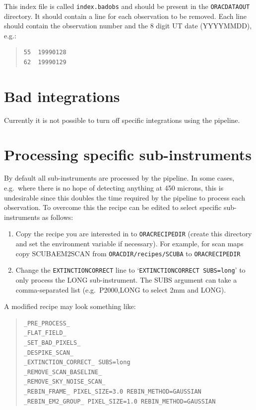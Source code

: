 \documentclass[twoside,11pt]{article}
\newcommand{\xlabel}[1]{}
\renewcommand{\_}{\texttt{\symbol{95}}}
\newcommand{\recipe}[1]{{\small\textsf{#1}}}
\newenvironment{myquote}{\begin{quote}\begin{small}}{\end{small}\end{quote}}
\begin{document}
This index file is called \texttt{index.badobs} and should be present in the
\texttt{ORAC\_DATA\_OUT} directory. It should contain a line for each observation to be
removed. Each line should contain the observation number and the 8 digit UT
date (YYYYMMDD), e.g.:

\begin{quote}
\begin{verbatim}
55  19990128
62  19990129
\end{verbatim}
\end{quote}



\section{Bad integrations\xlabel{bad_observations}}

Currently it is not possible to turn off specific integrations
using the pipeline.

\section{Processing specific sub-instruments\xlabel{processing_specific_sub_instruments}}

By default all sub-instruments are processed by the pipeline. In some
cases, e.g.\ where there is no hope of detecting anything at 450 microns, 
this is undesirable since this doubles the time required by the pipeline
to process each observation. To overcome this the recipe can be
edited to select specific sub-instruments as follows:

\begin{enumerate}
\item Copy the recipe you are interested in to \texttt{ORAC\_RECIPE\_DIR}
(create this directory and set the environment variable if necessary). For
example, for scan maps copy \recipe{SCUBA\_EM2SCAN} from
\texttt{ORAC\_DIR/recipes/SCUBA} to \texttt{ORAC\_RECIPE\_DIR}

\item Change the \texttt{\_EXTINCTION\_CORRECT\_} line to
`\texttt{\_EXTINCTION\_CORRECT\_ SUBS=long}' to only process the LONG
sub-instrument. The SUBS argument can take a comma-separated list (e.g.\
P2000,LONG to select 2mm and LONG).

\end{enumerate}

A modified recipe may look something like:

\begin{myquote}
\begin{verbatim}
_PRE_PROCESS_
_FLAT_FIELD_
_SET_BAD_PIXELS_
_DESPIKE_SCAN_
_EXTINCTION_CORRECT_ SUBS=long
_REMOVE_SCAN_BASELINE_
_REMOVE_SKY_NOISE_SCAN_
_REBIN_FRAME_ PIXEL_SIZE=3.0 REBIN_METHOD=GAUSSIAN
_REBIN_EM2_GROUP_ PIXEL_SIZE=1.0 REBIN_METHOD=GAUSSIAN
\end{verbatim}
\end{myquote}
\end{document}
